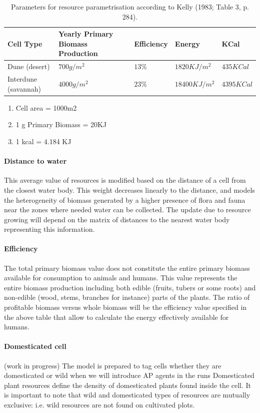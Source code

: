 \documentclass[11pt,oneside,a4paper,openright]{report}
\begin{document}
\begin{table}[ht!]
\centering	
	\begin{tabular}[c]{|l|l|l|l|l|}
	\hline
	Cell Type & Yearly Primary Biomass Production & Efficiency & Energy & KCal \\
	\hline
	Dune (desert) & $700g/m^2$ & $13\%$ & $1820KJ/m^2$ & $435KCal$ \\ 
	\hline
	Interdune (savannah) & $4000g/m^2$ & $23\%$ & $18400KJ/m^2$ & $4395KCal$ \\
	\hline
	\end{tabular}
	\caption{Parameters for resource parametrisation according to Kelly (1983; Table 3, p. 284).}
	\label{tab:tabResources}
\end{table}

\begin{enumerate}
 \item Cell area = 1000m2
 \item 1 g Primary Biomass = 20KJ
 \item 1 kcal = 4.184 KJ
\end{enumerate}



\paragraph{Distance to water}
This average value of resources is modified based on the distance of a cell from the closest
water body. This weight decreases linearly to the distance, and models the heterogeneity of
biomass generated by a higher presence of flora and fauna near the zones where needed
water can be collected. The update due to resource growing will depend on the matrix of distances
to the nearest water body representing this information.

\paragraph{Efficiency}
The total primary biomass value does not constitute the entire primary biomass available for
consumption to animals and humans. This value represents the entire biomass production
including both edible (fruits, tubers or some roots) and non-edible (wood, stems, branches
 for instance) parts of the plants. The ratio of profitable biomass versus whole biomass will be the
efficiency value specified in the above table that allow to calculate the energy effectively
available for humans.

\paragraph{Domesticated cell} (work in progress)
The model is prepared to tag cells whether they are domesticated or wild when we will introduce AP 
agents in the runs
Domesticated plant resources define the density of domesticated plants found inside the cell. It is important to note that wild and domesticated types of resources 
are mutually exclusive: i.e. wild resources are not found on cultivated plots. 
\end{document}

